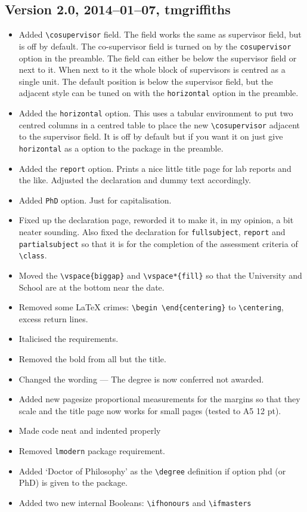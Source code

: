 \documentclass[12pt,oneside]{article}
\newcommand{\option}[1]{\texttt{\color{Green}#1}} %
\newcommand{\command}[1]{\texttt{\color{Red}#1}} %
\begin{document}
\subsection*{Version 2.0, 2014–01–07, tmgriffiths}
\begin{itemize}
    \item Added \command{\textbackslash{}cosupervisor} field. The field works the same as supervisor field, but is off by default. The co-supervisor field is turned on by the \option{cosupervisor} option in the preamble. The field can either be below the supervisor field or next to it. When next to it the whole block of supervisors is centred as a single unit. The default position is below the supervisor field, but the adjacent style can be tuned on with the \option{horizontal} option in the preamble.
    \item Added the \option{horizontal} option. This uses a tabular environment to put two centred columns in a centred table to place the new \command{\textbackslash{}cosupervisor} adjacent to the supervisor field. It is off by default but if you want it on just give \option{horizontal} as a option to the package in the preamble.
    \item Added the \option{report} option. Prints a nice little title page for lab reports and the like. Adjusted the declaration and dummy text accordingly.
    \item Added \option{PhD} option. Just for capitalisation.
    \item Fixed up the declaration page, reworded it to make it, in my opinion, a bit neater sounding. Also fixed the declaration for \option{fullsubject}, \option{report} and \option{partialsubject} so that it is for the completion of the assessment criteria of \command{\textbackslash{}class}.
    \item Moved the \texttt{\textbackslash{}vspace\{biggap\}} and \texttt{\textbackslash{}vspace*\{fill\}} so that the University
and School are at the bottom near the date.
    \item Removed some LaTeX crimes: \texttt{\textbackslash{}begin \textbackslash{}end\{centering\}\texttt{}} to \texttt{\textbackslash{}centering}, excess return lines.
    \item Italicised the requirements.
    \item Removed the bold from all but the title.
    \item Changed the wording — The degree is now conferred not awarded.
    \item Added new pagesize proportional measurements for the margins so that they scale and the title page now works for small pages (tested to A5 12 pt).
    \item Made code neat and indented properly
    \item Removed \texttt{lmodern} package requirement.
    \item Added `Doctor of Philosophy' as the \command{\textbackslash{}degree} definition if option phd (or
PhD) is given to the package.
    \item Added two new internal Booleans: \command{\textbackslash{}ifhonours} and \command{\textbackslash{}ifmasters}
    
\end{itemize}
\end{document}
